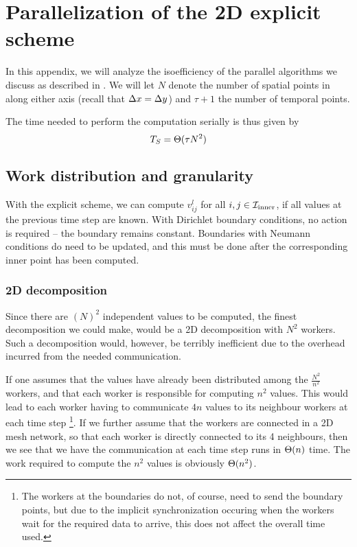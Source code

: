 
\section{Parallelization of the 2D explicit scheme}
\label{appx:parallel}

In this appendix, we will analyze the isoefficiency of the parallel algorithms we discuss as described in \cite{inf3380_bok}. We will let $N$ denote the number of spatial points in along either axis (recall that ${\Delta x} = {\Delta y}$) and $\tau+1$ the number of temporal points.

The time needed to perform the computation serially is thus given by
\begin{equation}
T_S = \Theta(\tau N^2)
\end{equation}


\subsection{Work distribution and granularity}
With the explicit scheme, we can compute $v_{ij}^l$ for all $i, j \in \mathcal{I}_{\mathrm{inner}}$, if all values at the previous time step are known. With Dirichlet boundary conditions, no action is required -- the boundary remains constant. Boundaries with Neumann conditions do need to be updated, and this must be done after the corresponding inner point has been computed.


\subsubsection{2D decomposition}
\label{appx:parallel:analysis:2d}
Since there are $(N)^2$ independent values to be computed, the finest decomposition we could make, would be a 2D decomposition with $N^2$ workers. Such a decomposition would, however, be terribly inefficient due to the overhead incurred from the needed communication.

If one assumes that the values have already been distributed among the $\frac{N^2}{n^2}$ workers, and that each worker is responsible for computing $n^2$ values. This would lead to each worker having to communicate $4n$ values to its neighbour workers at each time step \footnote{The workers at the boundaries do not, of course, need to send the boundary points, but due to the implicit synchronization occuring when the workers wait for the required data to arrive, this does not affect the overall time used.}.
If we further assume that the workers are connected in a 2D mesh network, so that each worker is directly connected to its 4 neighbours, then we see that we have the communication at each time step runs in $\Theta (n)$ time. The work required to compute the $n^2$ values is obviously $\Theta(n^2)$.

